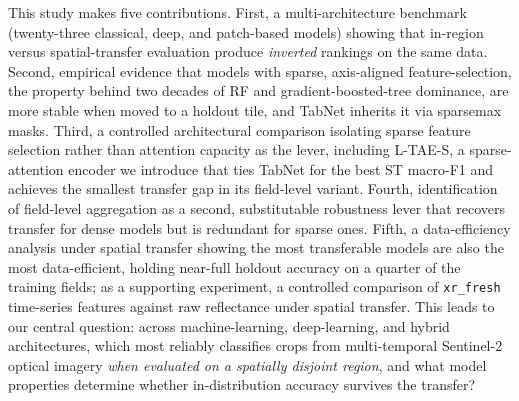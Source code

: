 \documentclass[preprint,authoryear]{elsarticle}
\begin{document}
This study makes five contributions. First, a multi-architecture benchmark (twenty-three classical, deep, and patch-based models) showing that in-region versus spatial-transfer evaluation produce \emph{inverted} rankings on the same data. Second, empirical evidence that models with sparse, axis-aligned feature-selection, the property behind two decades of RF and gradient-boosted-tree dominance, are more stable when moved to a holdout tile, and TabNet inherits it via sparsemax masks. Third, a controlled architectural comparison isolating sparse feature selection rather than attention capacity as the lever, including L-TAE-S, a sparse-attention encoder we introduce that ties TabNet for the best ST macro-F1 and achieves the smallest transfer gap in its field-level variant. Fourth, identification of field-level aggregation as a second, substitutable robustness lever that recovers transfer for dense models but is redundant for sparse ones. Fifth, a data-efficiency analysis under spatial transfer showing the most transferable models are also the most data-efficient, holding near-full holdout accuracy on a quarter of the training fields; as a supporting experiment, a controlled comparison of \texttt{xr\_fresh} time-series features against raw reflectance under spatial transfer. This leads to our central question: across machine-learning, deep-learning, and hybrid architectures, which most reliably classifies crops from multi-temporal Sentinel-2 optical imagery \emph{when evaluated on a spatially disjoint region}, and what model properties determine whether in-distribution accuracy survives the transfer?
\end{document}

